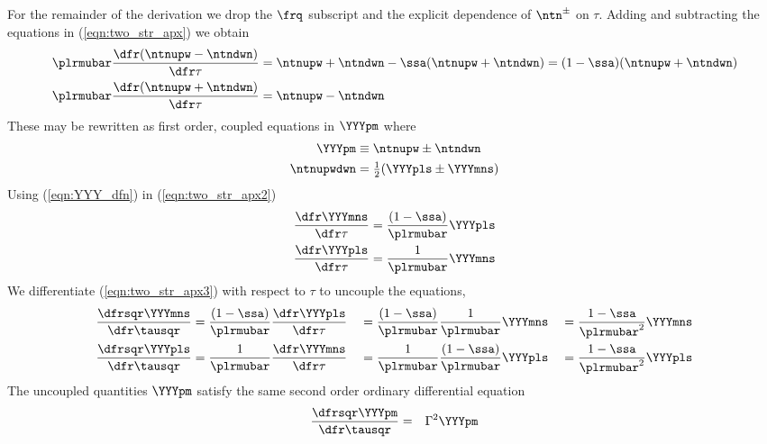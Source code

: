 \documentclass[12pt]{article}
\begin{document}
For the remainder of the derivation we drop the $\frq$
subscript and the explicit dependence of $\ntn^{\pm}$ on $\tau$.
Adding and subtracting the equations in (\ref{eqn:two_str_apx}) we
obtain
\begin{subequations}
\label{eqn:two_str_apx2}
\begin{align}
\plrmubar \frac{\dfr ( \ntnupw - \ntndwn ) }{\dfr\tau} & =  
\ntnupw + \ntndwn - \ssa ( \ntnupw + \ntndwn )
= (1 - \ssa) ( \ntnupw + \ntndwn ) \\
\plrmubar \frac{\dfr ( \ntnupw + \ntndwn ) }{\dfr\tau} & =  
\ntnupw - \ntndwn
\end{align}
\end{subequations} 
These may be rewritten as first order, coupled equations in $\YYYpm$
where 
\begin{subequations}
\begin{align}
\label{eqn:YYY_dfn}
\YYYpm & \equiv \ntnupw \pm \ntndwn \\
\label{eqn:ntn_upwdwn_dfn}
\ntnupwdwn & = {\textstyle\frac{1}{2}} ( \YYYpls \pm \YYYmns )
\end{align}
\end{subequations} 
Using (\ref{eqn:YYY_dfn}) in (\ref{eqn:two_str_apx2})
\begin{subequations}
\label{eqn:two_str_apx3}
\begin{align}
\frac{\dfr\YYYmns}{\dfr\tau} & =  
\frac{(1 - \ssa)}{\plrmubar} \YYYpls \\
\frac{\dfr\YYYpls}{\dfr\tau} & =  
\frac{1}{\plrmubar} \YYYmns
\end{align}
\end{subequations} 
We differentiate (\ref{eqn:two_str_apx3}) with respect to $\tau$
to uncouple the equations, 
\begin{alignat*}{3} %
\frac{\dfrsqr\YYYmns}{\dfr\tausqr} &=  
\frac{(1 - \ssa)}{\plrmubar} \frac{\dfr\YYYpls}{\dfr\tau} 
&&= \frac{(1 - \ssa)}{\plrmubar} \frac{1}{\plrmubar} \YYYmns
&&= \frac{1 - \ssa}{\plrmubar^{2}} \YYYmns \\
\frac{\dfrsqr\YYYpls}{\dfr\tausqr} &= 
\frac{1}{\plrmubar} \frac{\dfr\YYYmns}{\dfr\tau}
&&= \frac{1}{\plrmubar} \frac{(1 - \ssa)}{\plrmubar} \YYYpls
&&= \frac{1 - \ssa}{\plrmubar^{2}} \YYYpls
\end{alignat*}
The uncoupled quantities $\YYYpm$ satisfy the same second
order ordinary differential equation
\begin{eqnarray}
\frac{\dfrsqr\YYYpm}{\dfr\tausqr} & = & \Gamma^{2} \YYYpm
\label{eqn:two_str_apx5}
\end{eqnarray}
\end{document}
